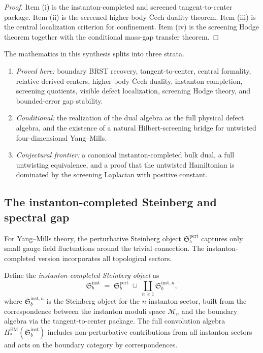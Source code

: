 \begin{proof}
Item (i) is the instanton-completed and screened tangent-to-center package.
Item (ii) is the screened higher-body \v{C}ech duality theorem.
Item (iii) is the central localization criterion for confinement.
Item (iv) is the screening Hodge theorem together with the conditional mass-gap transfer theorem.
\end{proof}

\begin{remark}
\label{rem:status-stratification-platonic-synthesis}
The mathematics in this synthesis splits into three strata.
\begin{enumerate}[label=(\alph*)]
\item \emph{Proved here:} boundary BRST recovery, tangent-to-center, central formality,
relative derived centers, higher-body \v{C}ech duality, instanton completion, screening quotients,
visible defect localization, screening Hodge theory, and bounded-error gap stability.
\item \emph{Conditional:} the realization of the dual algebra as the full physical defect algebra,
and the existence of a natural Hilbert-screening bridge for untwisted four-dimensional Yang--Mills.
\item \emph{Conjectural frontier:} a canonical instanton-completed bulk dual, a full untwisting equivalence,
and a proof that the untwisted Hamiltonian is dominated by the screening Laplacian with positive constant.
\end{enumerate}
\end{remark}

\subsection{The instanton-completed Steinberg and spectral gap}
\label{subsec:instanton-steinberg-spectral-gap}

\providecommand{\Steinb}{\mathfrak{S}}

For Yang--Mills theory, the perturbative Steinberg object $\Steinb_b^{\mathrm{pert}}$
captures only small gauge field fluctuations around the trivial connection.
The instanton-completed version incorporates all topological sectors.

\begin{construction}
\label{con:instanton-completed-steinberg}
Define the \emph{instanton-completed Steinberg object} as
\[
  \Steinb_b^{\mathrm{inst}}
  \;=\;
  \Steinb_b^{\mathrm{pert}}
  \;\cup\;
  \coprod_{n \geq 1} \Steinb_b^{\mathrm{inst},n},
\]
where $\Steinb_b^{\mathrm{inst},n}$ is the Steinberg object for the $n$-instanton sector,
built from the correspondence between the instanton moduli space $\mathcal{M}_n$
and the boundary algebra via the tangent-to-center package.
The full convolution algebra $H_*^{\mathrm{BM}}(\Steinb_b^{\mathrm{inst}})$
includes non-perturbative contributions from all instanton sectors
and acts on the boundary category by correspondences.
\end{construction}

